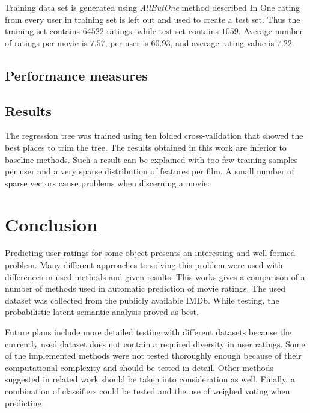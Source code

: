\documentclass[conference,a4paper]{IEEEtran}
\begin{document}
Training data set is generated using \emph{AllButOne} method described In
One rating from every user in training set is
left out and used to create a test set. Thus the training set contains $64522$
ratings, while test set contains $1059$. Average number of ratings per movie is
$7.57$, per user is $60.93$, and average rating value is $7.22$.


\subsection{Performance measures}

\subsection{Results}

The regression tree was trained using ten folded cross-validation that showed the
best places to trim the tree. The results obtained in this work are inferior to
baseline methods. Such a result can be explained with too few training samples
per user and a very sparse distribution of features per film. A small number of
sparse vectors cause problems when discerning a movie.
 

\section{Conclusion}

Predicting user ratings for some object presents an interesting and well formed
problem. Many different approaches to solving this problem were used with
differences in used methods and given results. This works gives a comparison of a
number of methods used in automatic prediction of movie ratings. The used dataset
was collected from the publicly available IMDb. While testing, the probabilistic
latent semantic analysis proved as best.

Future plans include more detailed testing with different datasets because the
currently used dataset does not contain a required diversity in user ratings.
Some of the implemented methods were not tested thoroughly enough because of
their computational complexity and should be tested in detail. Other methods suggested
in related work should be taken into consideration as well. Finally, a
combination of classifiers could be tested and the use of weighed voting when
predicting.
 

\nocite{*}


\end{document}
